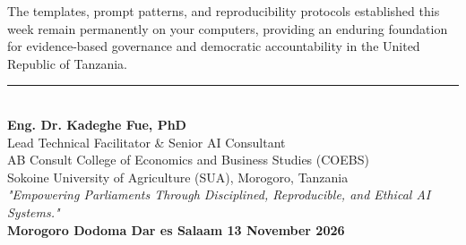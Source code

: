 \documentclass[11pt, a4paper]{report}
\begin{document}
The templates, prompt patterns, and reproducibility protocols established this week remain permanently on your computers, providing an enduring foundation for evidence-based governance and democratic accountability in the United Republic of Tanzania.

\vspace{1.5cm}
\begin{center}
    \rule{0.65\textwidth}{0.4pt}\\[0.3cm]
    \textbf{\Large Eng. Dr. Kadeghe Fue, PhD}\\
    Lead Technical Facilitator \& Senior AI Consultant\\
    AB Consult \textbullet{} College of Economics and Business Studies (COEBS)\\
    Sokoine University of Agriculture (SUA), Morogoro, Tanzania\\[0.3cm]
    \small\textit{"Empowering Parliaments Through Disciplined, Reproducible, and Ethical AI Systems."}\\[0.6cm]
    \textbf{Morogoro \textbullet{} Dodoma \textbullet{} Dar es Salaam \textbullet{} 13 November 2026}
\end{center}
\end{document}
